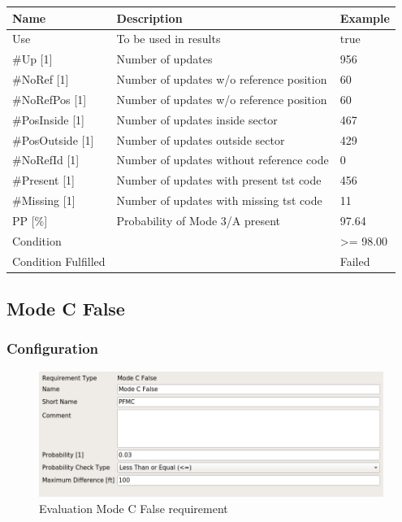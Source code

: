 \begin{center}
 \begin{table}[H]
  \begin{tabularx}{\textwidth}{ | l | X |  l | }
    \hline
    \textbf{Name} & \textbf{Description} & \textbf{Example} \\ \hline
    Use & To be used in results & true \\ \hline
    \#Up [1] & Number of updates & 956 \\ \hline
    \#NoRef [1] & Number of updates w/o reference position & 60 \\ \hline
    \#NoRefPos [1] & Number of updates w/o reference position  & 60 \\ \hline
    \#PosInside [1] & Number of updates inside sector & 467 \\ \hline
    \#PosOutside [1] & Number of updates outside sector & 429 \\ \hline
    \#NoRefId [1] & Number of updates without reference code & 0 \\ \hline
    \#Present [1] & Number of updates with present tst code & 456 \\ \hline
    \#Missing [1] & Number of updates with missing tst code & 11 \\ \hline
    PP [\%] & Probability of Mode 3/A present & 97.64 \\ \hline
    Condition &  & >= 98.00 \\ \hline
    Condition Fulfilled &  & Failed \\ \hline
\end{tabularx}
\end{table}
\end{center}


\subsection{Mode C False}
\label{sec:eval_req_mc_false} 

\subsubsection{Configuration}

\begin{figure}[H]
    \includegraphics[width=14cm,frame]{../screenshots/eval_req_mc_false.png}
  \caption{Evaluation Mode C False requirement}
\end{figure}

